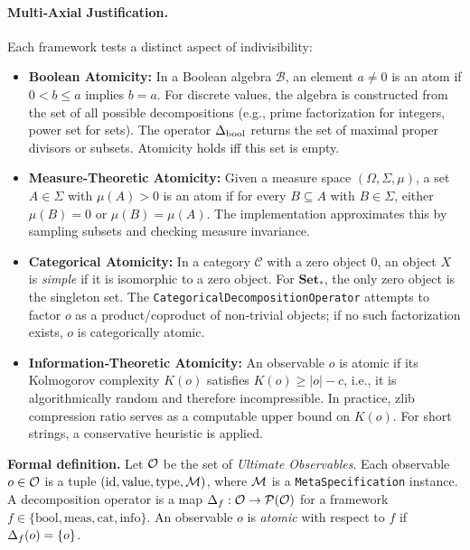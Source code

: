 \paragraph{Multi‑Axial Justification.}
Each framework tests a distinct aspect of indivisibility:
\begin{itemize}
    \item \textbf{Boolean Atomicity:} In a Boolean algebra $\mathcal{B}$, an element $a \neq 0$ is an atom if $0 < b \leq a$ implies $b = a$. For discrete values, the algebra is constructed from the set of all possible decompositions (e.g., prime factorization for integers, power set for sets). The operator $\Delta_{\text{bool}}$ returns the set of maximal proper divisors or subsets. Atomicity holds iff this set is empty.
    \item \textbf{Measure‑Theoretic Atomicity:} Given a measure space $(\Omega, \Sigma, \mu)$, a set $A \in \Sigma$ with $\mu(A) > 0$ is an atom if for every $B \subseteq A$ with $B \in \Sigma$, either $\mu(B)=0$ or $\mu(B)=\mu(A)$. The implementation approximates this by sampling subsets and checking measure invariance.
    \item \textbf{Categorical Atomicity:} In a category $\mathcal{C}$ with a zero object $0$, an object $X$ is \emph{simple} if it is isomorphic to a zero object. For $\mathbf{Set}_*$, the only zero object is the singleton set. The \texttt{CategoricalDecompositionOperator} attempts to factor $o$ as a product/coproduct of non‑trivial objects; if no such factorization exists, $o$ is categorically atomic.
    \item \textbf{Information‑Theoretic Atomicity:} An observable $o$ is atomic if its Kolmogorov complexity $K(o)$ satisfies $K(o) \geq |o| - c$, i.e., it is algorithmically random and therefore incompressible. In practice, zlib compression ratio serves as a computable upper bound on $K(o)$. For short strings, a conservative heuristic is applied.
\end{itemize}

\textbf{Formal definition.} Let $\mathcal{O}$ be the set of \textit{Ultimate Observables}. Each observable $o \in \mathcal{O}$ is a tuple $(\text{id}, \text{value}, \text{type}, \mathcal{M})$, where $\mathcal{M}$ is a \texttt{MetaSpecification} instance. A decomposition operator is a map $\Delta_f: \mathcal{O} \to \mathcal{P}(\mathcal{O})$ for a framework $f \in \{\text{bool}, \text{meas}, \text{cat}, \text{info}\}$. An observable $o$ is \emph{atomic} with respect to $f$ if $\Delta_f(o) = \{o\}$.


